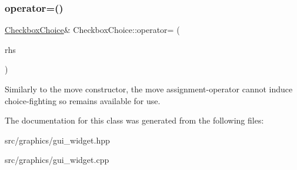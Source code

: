 \subsubsection{\texorpdfstring{operator=()}{operator=()}\hspace{0.1cm}{\footnotesize\ttfamily [2/2]}}
{\footnotesize\ttfamily \mbox{\hyperlink{class_checkbox_choice}{Checkbox\+Choice}}\& Checkbox\+Choice\+::operator= (\begin{DoxyParamCaption}\item[{\mbox{\hyperlink{class_checkbox_choice}{Checkbox\+Choice}} \&\&}]{rhs }\end{DoxyParamCaption})\hspace{0.3cm}{\ttfamily [default]}}

Similarly to the move constructor, the move assignment-\/operator cannot induce choice-\/fighting so remains available for use. 

The documentation for this class was generated from the following files\+:\begin{DoxyCompactItemize}
\item 
src/graphics/gui\+\_\+widget.\+hpp\item 
src/graphics/gui\+\_\+widget.\+cpp\end{DoxyCompactItemize}
